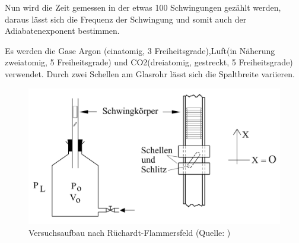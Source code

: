 Nun wird die Zeit gemessen in der etwas 100 Schwingungen gezählt werden,
daraus lässt sich die Frequenz der Schwingung und somit auch der Adiabatenexponent
bestimmen.

Es werden die Gase Argon (einatomig, 3 Freiheitsgrade),Luft(in Näherung
zweiatomig, 5 Freiheitsgrade) und CO2(dreiatomig, gestreckt, 5 Freiheitsgrade)
verwendet. Durch zwei Schellen am Glasrohr lässt sich die Spaltbreite
variieren. 
\begin{figure}[H]
\centering
\includegraphics[width=0.7\linewidth]{./bilder/versuch1}
\caption{Versuchsaufbau nach Rüchardt-Flammersfeld (Quelle: \cite{anleitung2015})}
\label{fig:aufbau1}
\end{figure}

\def\vFlasche{5350}

